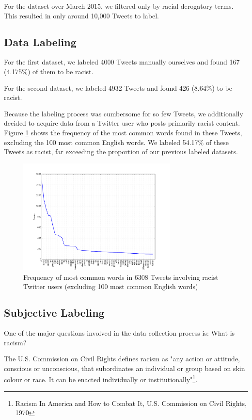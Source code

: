 \documentclass[]{article}
\begin{document}
For the dataset over March 2015, we filtered only by racial derogatory terms. This resulted in only around 10,000 Tweets to label.

\subsection{Data Labeling}

For the first dataset, we labeled 4000 Tweets manually ourselves and found 167 (4.175\%) of them to be racist.

For the second dataset, we labeled 4932 Tweets and found 426 (8.64\%) to be racist.

Because the labeling process was cumbersome for so few Tweets, we additionally decided to acquire data from a Twitter user who posts primarily racist content. Figure \ref{fig:word_count} shows the frequency of the most common words found in these Tweets, excluding the 100 most common English words. We labeled 54.17\% of these Tweets as racist, far exceeding the proportion of our previous labeled datasets.

\begin{figure}[h]
\label{fig:word_count}
\caption{Frequency of most common words in 6308 Tweets involving racist Twitter users (excluding 100 most common English words)}
\includegraphics[width=8cm]{word_count}
\centering
\end{figure}

\subsection{Subjective Labeling}

One of the major questions involved in the data collection process is: What is racism? 

The U.S. Commission on Civil Rights defines racism as "any action or attitude, conscious or unconscious, that subordinates an individual or group based on skin colour or race. It can be enacted individually or institutionally"\footnote[1]{Racism In America and How to Combat It, U.S. Commission on Civil Rights, 1970}.
\end{document}
